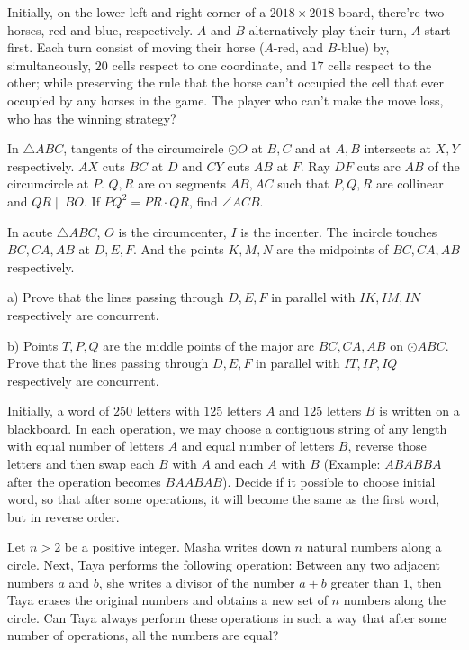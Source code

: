 \documentclass[11pt]{scrartcl}
\begin{document}
\begin{problem}[1637184643761804371]
Initially, on the lower left and right corner of a $2018\times 2018$ board, there're two horses, red and blue, respectively. $A$ and $B$ alternatively play their turn, $A$ start first. Each turn consist of moving their horse ($A$-red, and $B$-blue) by, simultaneously, $20$ cells respect to one coordinate, and $17$ cells respect to the other; while preserving the rule that the horse can't occupied the cell that ever occupied by any horses in the game. The player who can't make the move loss, who has the winning strategy?
\end{problem}
\begin{problem}[162618813015033]
In $\triangle {ABC}$, tangents of the circumcircle $\odot {O}$ at $B, C$ and at $A, B$ intersects at $X, Y$ respectively. $AX$ cuts $BC$ at ${D}$ and $CY$ cuts $AB$ at ${F}$. Ray $DF$ cuts arc $AB$ of the circumcircle at ${P}$. $Q, R$ are on segments $AB, AC$ such that $P, Q, R$ are collinear and $QR \parallel BO$. If $PQ^2=PR \cdot QR$, find $\angle ACB$.
\end{problem}
\begin{problem}[423911944927735]
In acute $\triangle ABC$, $O$ is the circumcenter, $I$ is the incenter. The incircle touches $BC,CA,AB$ at $D,E,F$. And the points $K,M,N$ are the midpoints of $BC,CA,AB$ respectively.

a) Prove that the lines passing through $D,E,F$ in parallel with $IK,IM,IN$ respectively are concurrent.

b) Points $T,P,Q$ are the middle points of the major arc $BC,CA,AB$ on $\odot ABC$. Prove that the lines passing through $D,E,F$ in parallel with $IT,IP,IQ$ respectively are concurrent.
\end{problem}
\begin{problem}[6497483389877629432]
Initially, a word of $250$ letters with $125$ letters $A$ and $125$ letters $B$ is written on a blackboard. In each operation, we may choose a contiguous string of any length with equal number of letters $A$ and equal number of letters $B$, reverse those letters and then swap each $B$ with $A$ and each $A$ with $B$ (Example: $ABABBA$ after the operation becomes $BAABAB$). Decide if it possible to choose initial word, so that after some operations, it will become the same as the first word, but in reverse order.
\end{problem}
\begin{problem}[989812634983805]
Let $n>2$ be a positive integer. Masha writes down $n$ natural numbers along a circle. Next, Taya performs the following operation: Between any two adjacent numbers $a$ and $b$, she writes a divisor of the number $a+b$ greater than $1$, then Taya erases the original numbers and obtains a new set of $n$ numbers along the circle. Can Taya always perform these operations in such a way that after some number of operations, all the numbers are equal?
\end{problem}
\end{document}
